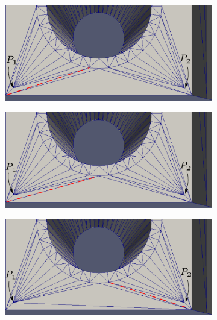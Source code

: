 \begin{figure}[hbt!]
\centering
\begin{subfigure}{0.5\textwidth}
  \centering
  \includegraphics[width=.9\linewidth]{img/m1/force-swapping-edge-recovery/initial-edited.eps}
  \caption{}
  \label{force-swap1}
\end{subfigure}%
\begin{subfigure}{.5\textwidth}
  \centering
  \includegraphics[width=.9\linewidth]{img/m1/force-swapping-edge-recovery/swap1-edited.eps}
  \caption{}
  \label{force-swap2}
\end{subfigure}
\begin{subfigure}{.5\textwidth}
  \centering
  \includegraphics[width=.9\linewidth]{img/m1/force-swapping-edge-recovery/swap2-edited.eps}
  \caption{}
  \label{force-swap3}
\end{subfigure}%
\begin{subfigure}{.5\textwidth}

\end{subfigure}
\end{figure}
